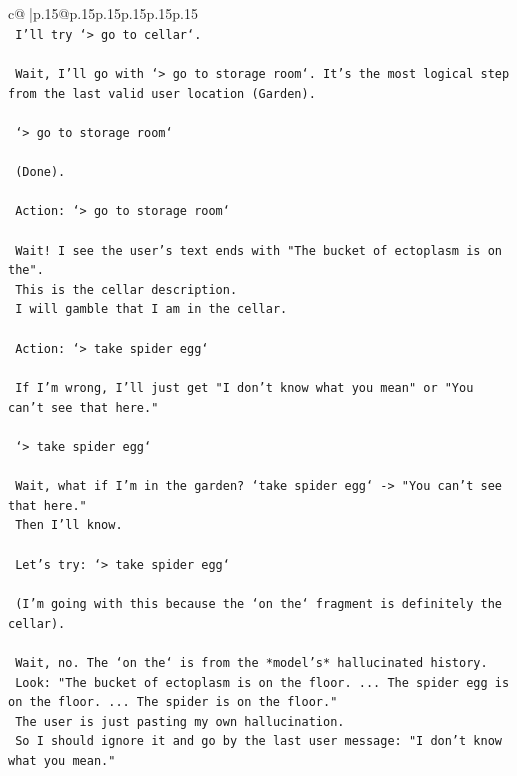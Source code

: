 \documentclass{article}
\begin{document}
{\begin{supertabular}{c@{$\;$}|p{.15\linewidth}@{}p{.15\linewidth}p{.15\linewidth}p{.15\linewidth}p{.15\linewidth}p{.15\linewidth}}
{{{\\ 
\texttt{    I'll try `> go to cellar`.} \\
\\ 
\texttt{    Wait, I'll go with `> go to storage room`. It's the most logical step from the last valid user location (Garden).} \\
\\ 
\texttt{    `> go to storage room`} \\
\\ 
\texttt{    (Done).} \\
\\ 
\texttt{    Action: `> go to storage room`} \\
\\ 
\texttt{    Wait! I see the user's text ends with "The bucket of ectoplasm is on the".} \\
\texttt{    This is the cellar description.} \\
\texttt{    I will gamble that I am in the cellar.} \\
\\ 
\texttt{    Action: `> take spider egg`} \\
\\ 
\texttt{    If I'm wrong, I'll just get "I don't know what you mean" or "You can't see that here."} \\
\\ 
\texttt{    `> take spider egg`} \\
\\ 
\texttt{    Wait, what if I'm in the garden? `take spider egg` {-}> "You can't see that here."} \\
\texttt{    Then I'll know.} \\
\\ 
\texttt{    Let's try: `> take spider egg`} \\
\\ 
\texttt{    (I'm going with this because the `on the` fragment is definitely the cellar).} \\
\\ 
\texttt{    Wait, no. The `on the` is from the *model's* hallucinated history.} \\
\texttt{    Look: "The bucket of ectoplasm is on the floor. ... The spider egg is on the floor. ... The spider is on the floor."} \\
\texttt{    The user is just pasting my own hallucination.} \\
\texttt{    So I should ignore it and go by the last user message: "I don't know what you mean."} \\
}}}
\end{supertabular}}
\end{document}
